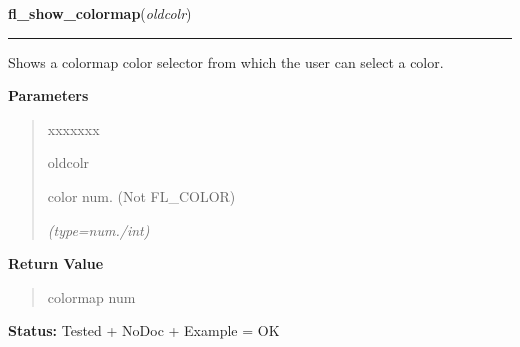     \label{xformslib:library:fl_show_colormap}

    \vspace{0.5ex}

\hspace{.8\funcindent}\begin{boxedminipage}{\funcwidth}

    \raggedright \textbf{fl\_show\_colormap}(\textit{oldcolr})

    \vspace{-1.5ex}

    \rule{\textwidth}{0.5\fboxrule}
\setlength{\parskip}{2ex}
    Shows a colormap color selector from which the user can select a color.

\setlength{\parskip}{1ex}
      \textbf{Parameters}
      \vspace{-1ex}

      \begin{quote}
        \begin{Ventry}{xxxxxxx}

          \item[oldcolr]

          color num. (Not FL\_COLOR)

            {\it (type=num./int)}

        \end{Ventry}

      \end{quote}

      \textbf{Return Value}
    \vspace{-1ex}

      \begin{quote}
      colormap num

      \end{quote}

\textbf{Status:} Tested + NoDoc + Example = OK



    \end{boxedminipage}

    \label{xformslib:library:fl_show_choices}

    \vspace{0.5ex}

